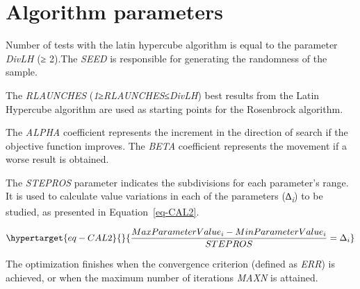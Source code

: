 \documentclass[
  letterpaper,
  DIV=11,
  numbers=noendperiod]{scrreprt}
\begin{document}
\hypertarget{algorithm-parameters-2}{%
\section{Algorithm parameters}\label{algorithm-parameters-2}}

Number of tests with the latin hypercube algorithm is equal to the
parameter \emph{DivLH} (≥ 2).The \emph{SEED} is responsible for
generating the randomness of the sample.

The \emph{RLAUNCHES} (\emph{1≥RLAUNCHES≤DivLH}) best results from the
Latin Hypercube algorithm are used as starting points for the Rosenbrock
algorithm.

The \emph{ALPHA} coefficient represents the increment in the direction
of search if the objective function improves. The \emph{BETA}
coefficient represents the movement if a worse result is obtained.

The \emph{STEPROS} parameter indicates the subdivisions for each
parameter's range. It is used to calculate value variations in each of
the parameters (\emph{∆\textsubscript{i}}) to be studied, as presented
in Equation~\ref{eq-CAL2}.

\begin{equation}\protect\hypertarget{eq-CAL2}{}{
\frac{MaxP{arameterValue}_{i} - Min{ParameterValue}_{i}}{STEPROS} = \mathrm{\Delta}_{i}
}\label{eq-CAL2}\end{equation}

The optimization finishes when the convergence criterion (defined as
\emph{ERR}) is achieved, or when the maximum number of iterations
\emph{MAXN} is attained.
\end{document}
